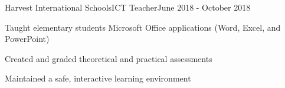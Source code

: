 \begin{resume_employer}{Harvest International Schools}{ICT Teacher}{}{June 2018 - October 2018}
    \item Taught elementary students Microsoft Office applications (Word, Excel, and PowerPoint)
    \item Created and graded theoretical and practical assessments
    \item Maintained a safe, interactive learning environment
\end{resume_employer}

